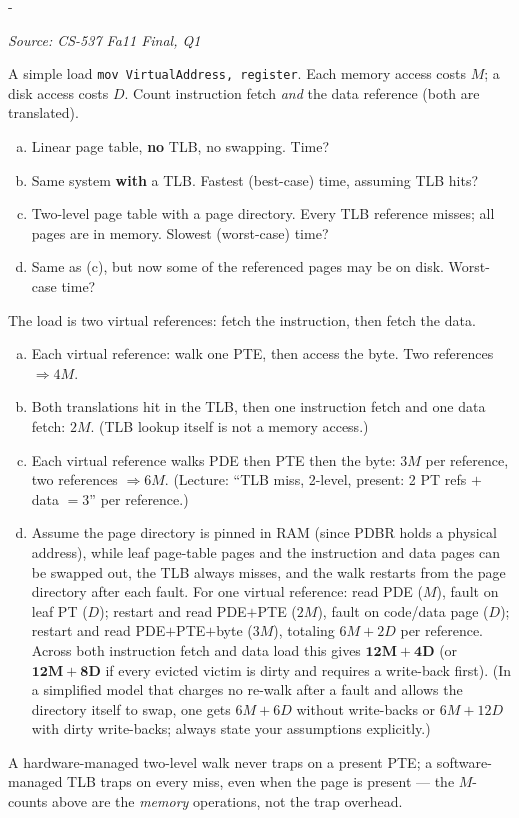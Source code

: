 \documentclass[11pt,a4paper]{article}
\makeatletter
\newcommand{\keepspace}[1]{\par\penalty-100\begingroup
  \setlength{\dimen@}{#1}\dimen@ii\pagegoal\advance\dimen@ii-\pagetotal
  \ifdim\dimen@>\dimen@ii\ifdim\dimen@ii>\z@\vfil\fi\break\fi\endgroup}
\newcounter{qn}[section]
\newenvironment{Qn}[4]{%
  \refstepcounter{qn}\keepspace{7\baselineskip}%
  \begin{tcolorbox}[qboxstyle, title={Q\thesection.\theqn\ \ [#1 \textbar\ #2]\ \ #4}]%
  {\footnotesize\color{g3}\textit{Source: #3}}\par\smallskip%
}{%
  \end{tcolorbox}%
}
\newenvironment{Sol}{%
  \begin{tcolorbox}[sboxstyle, title={Solution}]%
}{%
  \end{tcolorbox}\vspace{0.35em}%
}
\makeatother
\begin{document}
\begin{Qn}{Hard}{Lect 13--14}{CS-537 Fa11 Final, Q1}{Worst/best memory-access counts: linear, TLB, two-level, swapping}
A simple load \texttt{mov VirtualAddress, register}. Each memory access
costs $M$; a disk access costs $D$. Count instruction fetch \emph{and}
the data reference (both are translated).
\begin{enumerate}[(a)]
\item Linear page table, \textbf{no} TLB, no swapping. Time?
\item Same system \textbf{with} a TLB. Fastest (best-case) time,
      assuming TLB hits?
\item Two-level page table with a page directory. Every TLB reference
      misses; all pages are in memory. Slowest (worst-case) time?
\item Same as (c), but now some of the referenced pages may be on disk.
      Worst-case time?
\end{enumerate}
\end{Qn}
\begin{Sol}
The load is two virtual references: fetch the instruction, then fetch
the data.
\begin{enumerate}[(a)]
\item Each virtual reference: walk one PTE, then access the byte.
      Two references $\Rightarrow 4M$.
\item Both translations hit in the TLB, then one instruction fetch and
      one data fetch: $2M$. (TLB lookup itself is not a memory access.)
\item Each virtual reference walks PDE then PTE then the byte: $3M$ per
      reference, two references $\Rightarrow 6M$.
      (Lecture: ``TLB miss, 2-level, present: 2 PT refs $+$ data $= 3$''
      per reference.)
\item Assume the page directory is pinned in RAM (since PDBR holds a
      physical address), while leaf page-table pages and the instruction
      and data pages can be swapped out, the TLB always misses, and the
      walk restarts from the page directory after each fault. For one
      virtual reference: read PDE ($M$), fault on leaf PT ($D$); restart
      and read PDE$+$PTE ($2M$), fault on code/data page ($D$); restart
      and read PDE$+$PTE$+$byte ($3M$), totaling $6M+2D$ per reference.
      Across both instruction fetch and data load this gives
      $\mathbf{12M+4D}$ (or $\mathbf{12M+8D}$ if every evicted victim is
      dirty and requires a write-back first). (In a simplified model
      that charges no re-walk after a fault and allows the directory
      itself to swap, one gets $6M+6D$ without write-backs or $6M+12D$
      with dirty write-backs; always state your assumptions explicitly.)
\end{enumerate}
A hardware-managed two-level walk never traps on a present PTE; a
software-managed TLB traps on every miss, even when the page is present
--- the $M$-counts above are the \emph{memory} operations, not the trap
overhead.
\end{Sol}
\end{document}
